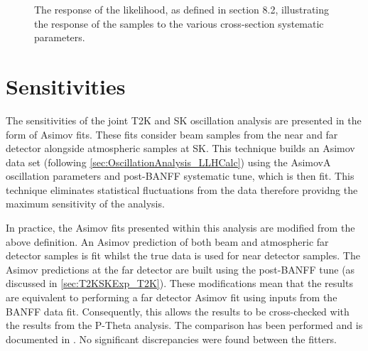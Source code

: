 \begin{figure}[h]
\begin{subfigure}[t]{0.5\textwidth}
  \end{subfigure}
  \caption{The response of the likelihood, as defined in section 8.2, illustrating the response of the samples to the various cross-section systematic parameters.}
  \label{fig:OscillationAnalysis_LLHScanSystPars}
\end{figure}

\clearpage
\section{Sensitivities}
\label{sec:OscillationAnalysis_Sensitivities}



The sensitivities of the joint T2K and SK oscillation analysis are presented in the form of Asimov fits. These fits consider beam samples from the near and far detector alongside atmospheric samples at SK. This technique builds an Asimov data set (following \autoref{sec:OscillationAnalysis_LLHCalc}) using the AsimovA oscillation parameters and post-BANFF systematic tune, which is then fit. This technique eliminates statistical fluctuations from the data therefore providng the maximum sensitivity of the analysis.

In practice, the Asimov fits presented within this analysis are modified from the above definition. An Asimov prediction of both beam and atmospheric far detector samples is fit whilst the true data is used for near detector samples. The Asimov predictions at the far detector are built using the post-BANFF tune (as discussed in \autoref{sec:T2KSKExp_T2K}). These modifications mean that the results are equivalent to performing a far detector Asimov fit using inputs from the BANFF data fit. Consequently, this allows the results to be cross-checked with the results from the P-Theta analysis. The comparison has been performed and is documented in \cite{barrow_M3_PT_Comp}. No significant discrepancies were found between the fitters.

